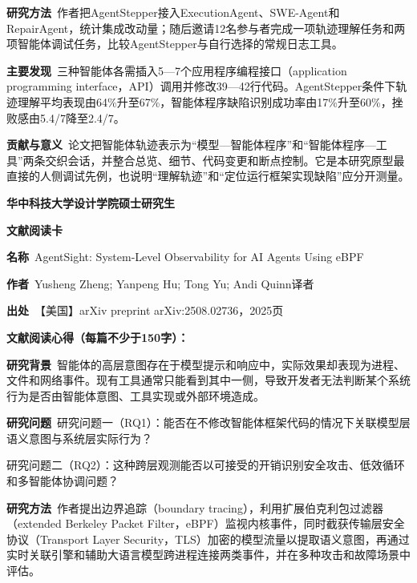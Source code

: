 \noindent\textbf{研究方法}\ 作者把AgentStepper接入ExecutionAgent、SWE-Agent和RepairAgent，统计集成改动量；随后邀请12名参与者完成一项轨迹理解任务和两项智能体调试任务，比较AgentStepper与自行选择的常规日志工具。\par
\noindent\textbf{主要发现}\ 三种智能体各需插入5—7个应用程序编程接口（application programming interface，API）调用并修改39—42行代码。AgentStepper条件下轨迹理解平均表现由64\%升至67\%，智能体程序缺陷识别成功率由17\%升至60\%，挫败感由5.4/7降至2.4/7。\par
\noindent\textbf{贡献与意义}\ 论文把智能体轨迹表示为“模型—智能体程序”和“智能体程序—工具”两条交织会话，并整合总览、细节、代码变更和断点控制。它是本研究原型最直接的人侧调试先例，也说明“理解轨迹”和“定位运行框架实现缺陷”应分开测量。\par
\clearpage
\begin{center}
{\songti\bfseries\fontsize{18.5pt}{27.75pt}\selectfont 华中科技大学设计学院硕士研究生\par}
{\songti\bfseries\fontsize{18.5pt}{27.75pt}\selectfont 文献阅读卡\par}
\end{center}
\vspace{0.25em}
\noindent\underline{}\par
\vspace{0.35em}
\noindent\textbf{名称}\ AgentSight: System-Level Observability for AI Agents Using eBPF\par
\noindent\textbf{作者}\ Yusheng Zheng; Yanpeng Hu; Tong Yu; Andi Quinn\quad 译者\par
\noindent\textbf{出处}\ 【美国】arXiv preprint arXiv:2508.02736，2025\quad 页\par
\vspace{0.35em}
\noindent\textbf{文献阅读心得（每篇不少于150字）：}\par
\noindent\textbf{研究背景}\ 智能体的高层意图存在于模型提示和响应中，实际效果却表现为进程、文件和网络事件。现有工具通常只能看到其中一侧，导致开发者无法判断某个系统行为是否由智能体意图、工具实现或外部环境造成。\par
\noindent\textbf{研究问题}\ 研究问题一（RQ1）：能否在不修改智能体框架代码的情况下关联模型层语义意图与系统层实际行为？\par
研究问题二（RQ2）：这种跨层观测能否以可接受的开销识别安全攻击、低效循环和多智能体协调问题？\par
\noindent\textbf{研究方法}\ 作者提出边界追踪（boundary tracing），利用扩展伯克利包过滤器（extended Berkeley Packet Filter，eBPF）监视内核事件，同时截获传输层安全协议（Transport Layer Security，TLS）加密的模型流量以提取语义意图，再通过实时关联引擎和辅助大语言模型跨进程连接两类事件，并在多种攻击和故障场景中评估。\par
